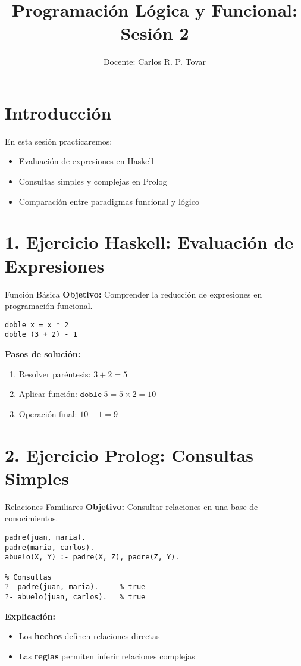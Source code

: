 \documentclass[12pt]{article}
\title{Programación Lógica y Funcional: Sesión 2}
\author{Docente: Carlos R. P. Tovar}
\date{}
\begin{document}
\maketitle

\section*{Introducción}
En esta sesión practicaremos:
\begin{itemize}
\item Evaluación de expresiones en Haskell
\item Consultas simples y complejas en Prolog
\item Comparación entre paradigmas funcional y lógico
\end{itemize}

\section*{1. Ejercicio Haskell: Evaluación de Expresiones}
\begin{ejercicio}{Función Básica}
\textbf{Objetivo:} Comprender la reducción de expresiones en programación funcional.

\begin{lstlisting}[style=haskell]
doble x = x * 2
doble (3 + 2) - 1
\end{lstlisting}

\textbf{Pasos de solución:}
\begin{enumerate}
\item Resolver paréntesis: \(3 + 2 = 5\)
\item Aplicar función: \(\texttt{doble}\ 5 = 5 \times 2 = 10\)
\item Operación final: \(10 - 1 = 9\)
\end{enumerate}
\end{ejercicio}

\section*{2. Ejercicio Prolog: Consultas Simples}
\begin{ejercicio}{Relaciones Familiares}
\textbf{Objetivo:} Consultar relaciones en una base de conocimientos.

\begin{lstlisting}[style=prolog]
% Base de conocimientos
padre(juan, maria).
padre(maria, carlos).
abuelo(X, Y) :- padre(X, Z), padre(Z, Y).

% Consultas
?- padre(juan, maria).     % true
?- abuelo(juan, carlos).   % true
\end{lstlisting}

\textbf{Explicación:}
\begin{itemize}
\item Los \textbf{hechos} definen relaciones directas
\item Las \textbf{reglas} permiten inferir relaciones complejas
\end{itemize}
\end{ejercicio}
\end{document}
